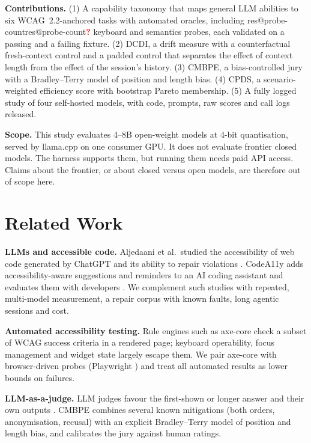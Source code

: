 \documentclass[conference]{IEEEtran}
\makeatletter
\newcommand{\res}[1]{\ifcsname res@#1\endcsname\csname res@#1\endcsname\else\pending{#1}\fi}
\newcommand{\pending}[1]{\textcolor{red}{\textbf{?}}}
\makeatother
\begin{document}
\textbf{Contributions.} (1) A capability taxonomy that maps general LLM abilities to six
WCAG~2.2-anchored tasks with automated oracles, including \res{probe-count} keyboard and
semantics probes, each validated on a passing and a failing fixture. (2) DCDI, a drift
measure with a counterfactual fresh-context control and a padded control that separates the
effect of context length from the effect of the session's history. (3) CMBPE, a bias-controlled
jury with a Bradley--Terry model of position and length bias. (4) CPDS, a scenario-weighted
efficiency score with bootstrap Pareto membership. (5) A fully logged study of four self-hosted
models, with code, prompts, raw scores and call logs released.

\textbf{Scope.} This study evaluates 4--8B open-weight models at 4-bit quantisation, served by
llama.cpp \cite{llamacpp} on one consumer GPU. It does not evaluate frontier closed models.
The harness supports them, but running them needs paid API access. Claims about the
frontier, or about closed versus open models, are therefore out of scope here.

\section{Related Work}

\textbf{LLMs and accessible code.} Aljedaani et al.\ studied the accessibility of web code
generated by ChatGPT and its ability to repair violations \cite{aljedaani2024chatgpt}.
CodeA11y adds accessibility-aware suggestions and reminders to an AI coding assistant and
evaluates them with developers \cite{mowar2025codea11y}. We complement such studies with
repeated, multi-model measurement, a repair corpus with known faults, long agentic sessions and
cost.

\textbf{Automated accessibility testing.} Rule engines such as axe-core \cite{axecore} check a
subset of WCAG success criteria \cite{wcag22} in a rendered page; keyboard operability, focus
management and widget state largely escape them. We pair axe-core with browser-driven probes
(Playwright \cite{playwright}) and treat all automated results as lower bounds on failures.

\textbf{LLM-as-a-judge.} LLM judges favour the first-shown or longer answer and their own
outputs \cite{zheng2023judging,wang2024fair,panickssery2024self}. CMBPE combines several known
mitigations (both orders, anonymisation, recusal) with an explicit Bradley--Terry model
\cite{bradley1952rank} of position and length bias, and calibrates the jury against human
ratings.
\end{document}
